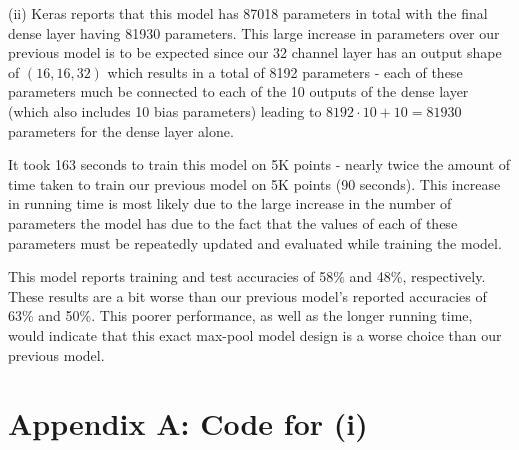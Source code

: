 \documentclass[12pt]{article}
\begin{document}
\indent (ii) Keras reports that this model has 87018 parameters in total with the final dense layer having 81930 parameters. This large increase in parameters over our previous model is to be expected since our 32 channel layer has an output shape of $(16, 16, 32)$ which results in a total of 8192 parameters - each of these parameters much be connected to each of the 10 outputs of the dense layer (which also includes 10 bias parameters) leading to $8192 \cdot 10 + 10 = 81930$ parameters for the dense layer alone.

It took 163 seconds to train this model on 5K points - nearly twice the amount of time taken to train our previous model on 5K points (90 seconds). This increase in running time is most likely due to the large increase in the number of parameters the model has due to the fact that the values of each of these parameters must be repeatedly updated and evaluated while training the model.

This model reports training and test accuracies of 58\% and 48\%, respectively. These results are a bit worse than our previous model's reported accuracies of 63\% and 50\%. This poorer performance, as well as the longer running time, would indicate that this exact max-pool model design is a worse choice than our previous model.

\section*{Appendix A: Code for (i)}
\end{document}
